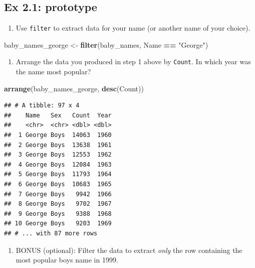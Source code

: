 \documentclass[]{book}
\newenvironment{Shaded}{\begin{snugshade}}{\end{snugshade}}
\newcommand{\KeywordTok}[1]{\textcolor[rgb]{0.13,0.29,0.53}{\textbf{#1}}}
\newcommand{\StringTok}[1]{\textcolor[rgb]{0.31,0.60,0.02}{#1}}
\newcommand{\OperatorTok}[1]{\textcolor[rgb]{0.81,0.36,0.00}{\textbf{#1}}}
\newcommand{\NormalTok}[1]{#1}
\providecommand{\tightlist}{%
  \setlength{\itemsep}{0pt}\setlength{\parskip}{0pt}}
\begin{document}
\subsection{Ex 2.1: prototype}\label{ex-2.1-prototype}

\begin{enumerate}
\def\labelenumi{\arabic{enumi}.}
\tightlist
\item
  Use \texttt{filter} to extract data for your name (or another name of
  your choice).
\end{enumerate}

\begin{Shaded}
\begin{Highlighting}[]
\NormalTok{baby_names_george <-}\StringTok{ }\KeywordTok{filter}\NormalTok{(baby_names, Name }\OperatorTok{==}\StringTok{ "George"}\NormalTok{)}
\end{Highlighting}
\end{Shaded}

\begin{enumerate}
\def\labelenumi{\arabic{enumi}.}
\setcounter{enumi}{1}
\tightlist
\item
  Arrange the data you produced in step 1 above by \texttt{Count}. In
  which year was the name most popular?
\end{enumerate}

\begin{Shaded}
\begin{Highlighting}[]
\KeywordTok{arrange}\NormalTok{(baby_names_george, }\KeywordTok{desc}\NormalTok{(Count))}
\end{Highlighting}
\end{Shaded}

\begin{verbatim}
## # A tibble: 97 x 4
##    Name   Sex   Count  Year
##    <chr>  <chr> <dbl> <dbl>
##  1 George Boys  14063  1960
##  2 George Boys  13638  1961
##  3 George Boys  12553  1962
##  4 George Boys  12084  1963
##  5 George Boys  11793  1964
##  6 George Boys  10683  1965
##  7 George Boys   9942  1966
##  8 George Boys   9702  1967
##  9 George Boys   9388  1968
## 10 George Boys   9203  1969
## # ... with 87 more rows
\end{verbatim}

\begin{enumerate}
\def\labelenumi{\arabic{enumi}.}
\setcounter{enumi}{2}
\tightlist
\item
  BONUS (optional): Filter the data to extract \emph{only} the row
  containing the most popular boys name in 1999.
\end{enumerate}
\end{document}
